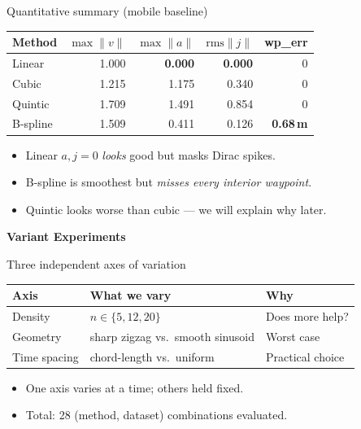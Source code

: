 \documentclass[aspectratio=169]{beamer}
\newcommand{\highlight}[1]{\textcolor{red!70!black}{\textbf{#1}}}
\newcommand{\sectiondivider}[1]{%
    \begin{frame}[plain]
    \begin{center}
    \Huge\bfseries\color{structure} #1
    \end{center}
    \end{frame}%
}
\begin{document}
\begin{frame}{Quantitative summary (mobile baseline)}
\centering
\renewcommand{\arraystretch}{1.25}
\begin{tabular}{l r r r r}
\toprule
\textbf{Method} & $\max\|v\|$ & $\max\|a\|$ & $\mathrm{rms}\|j\|$ & wp\_err \\
\midrule
Linear   & 1.000 & \textbf{0.000} & \textbf{0.000} & 0      \\
Cubic    & 1.215 & 1.175          & 0.340          & 0      \\
Quintic  & 1.709 & 1.491          & 0.854          & 0      \\
B-spline & 1.509 & 0.411          & 0.126          & \highlight{0.68\,m} \\
\bottomrule
\end{tabular}
\vspace{0.7em}
\begin{itemize}
\small
\item Linear $a, j = 0$ \emph{looks} good but masks Dirac spikes.
\item B-spline is smoothest but \emph{misses every interior waypoint}.
\item Quintic looks worse than cubic --- we will explain why later.
\end{itemize}
\end{frame}

\sectiondivider{Variant Experiments}

\begin{frame}{Three independent axes of variation}
\centering
\renewcommand{\arraystretch}{1.3}
\begin{tabular}{l l l}
\toprule
\textbf{Axis}    & \textbf{What we vary}             & \textbf{Why} \\
\midrule
Density          & $n \in \{5, 12, 20\}$             & Does more help? \\
Geometry         & sharp zigzag vs.\ smooth sinusoid & Worst case \\
Time spacing     & chord-length vs.\ uniform         & Practical choice \\
\bottomrule
\end{tabular}
\vspace{1em}
\begin{itemize}
    \item One axis varies at a time; others held fixed.
    \item Total: 28 (method, dataset) combinations evaluated.
\end{itemize}
\end{frame}
\end{document}

